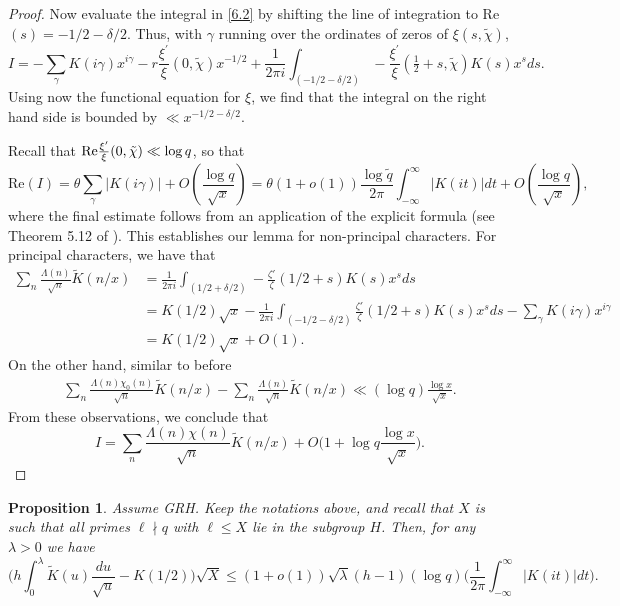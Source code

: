 \documentclass [12pt]{amsart}
\newtheorem{prop}{Proposition}[section]
\numberwithin{equation}{section}
\newcommand{\bfrac}[2]{\left(\frac{#1}{#2}\right)}
\newcommand{\tRe}{\textup{Re}}
\begin{document}
\begin{proof}
 Now evaluate the integral in \eqref{6.2} by shifting the line of integration to Re$(s)=- 1/2-\delta/2$.  Thus, with $\gamma$ running over the ordinates of zeros of $\xi(s,\tilde \chi)$,
 $$ 
 I = -\sum_{\gamma} K(i\gamma) x^{i\gamma}  -r\frac{\xi^{\prime}}{\xi}(0,\tilde \chi)x^{-1/2} + \frac{1}{2\pi i} \int_{(-1/2-\delta/2)} 
  -\frac{\xi^{\prime}}{\xi}(\tfrac 12+s,\tilde \chi)K(s) x^s ds. 
 $$
 Using now the functional equation for $\xi$, we 
 find that the integral on the right hand side is bounded by $\ll x^{-1/2-\delta/2}$.  
 
  Recall that $\tRe \frac{\xi^{\prime}}{\xi}(0,\tilde \chi) \ll \log q$, so that
  $$ 
  \text{Re}(I) = \theta \sum_{\gamma} |K(i\gamma)| + O\bfrac{\log q}{\sqrt{x}} = \theta (1+o(1)) \frac{\log {\tilde q}}{2\pi} 
  \int_{-\infty}^{\infty} |K(it)|dt + O\bfrac{\log q}{\sqrt{x}},  
  $$
 where the final estimate follows from an application of the explicit formula (see Theorem 5.12 of \cite{IK}).  
 This establishes our lemma for non-principal characters.  For principal characters, we have that
  \begin{align*}
  \sum_{n} \frac{\Lambda(n) }{\sqrt{n}} {\tilde K}(n/x) 
  &= \frac{1}{2\pi i}\int_{(1/2 + \delta/2)}-\frac{\zeta'}{\zeta}(1/2+s)K(s)x^s ds\\
  &=K(1/2)\sqrt{x} - \frac{1}{2\pi i}\int_{(-1/2-\delta/2)}\frac{\zeta'}{\zeta}(1/2+s)K(s)x^s ds - \sum_{\gamma} K(i\gamma) x^{i\gamma}\\
  &= K(1/2) \sqrt{x} + O(1).
  \end{align*}
  On the other hand, similar to before
 \begin{align*}
 \sum_{n} \frac{\Lambda(n){\chi_0}(n)}{\sqrt{n}} {\tilde K}(n/x) 
- \sum_{n} \frac{\Lambda(n)}{\sqrt{n}} {\tilde K}(n/x)
 \ll (\log q) \frac{\log x}{\sqrt{x}}. 
 \end{align*}
 From these observations, we conclude that  
$$
 I=\sum_{n} \frac{\Lambda(n)\chi(n)}{\sqrt{n}} {\tilde K}(n/x) + O\Big(1+\log q \frac{\log x}{\sqrt{x}}\Big). 
$$
 \end{proof}

   

\begin{prop}\label{prop:theoretical}  Assume GRH.  Keep the notations above, and recall that $X$ is such that 
all primes $\ell \nmid q$ with $\ell \le X$ lie in the subgroup $H$.  Then, for any $\lambda>0$ 
we have 
$$ 
\Big(h \int_0^{\lambda} {\tilde K}(u) 
\frac{du}{\sqrt{u}} - K(1/2)\Big) 
\sqrt{X} \le (1+o(1)) \sqrt{\lambda} (h-1) (\log q) \Big(\frac{1}{2\pi} \int_{-\infty}^{\infty} |K(it)|dt \Big). 
$$  
\end{prop}
\end{document}
